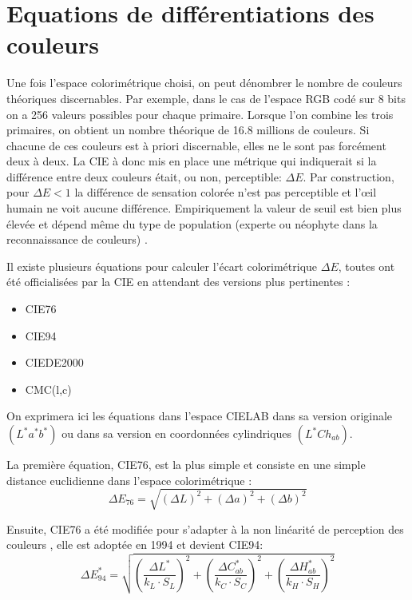 	\section{Equations de différentiations des couleurs}
	\par Une fois l'espace colorimétrique choisi, on peut dénombrer le nombre de couleurs théoriques discernables. Par exemple, dans le cas de l'espace RGB codé sur 8 bits on a 256 valeurs possibles pour chaque primaire. Lorsque l'on combine les trois primaires, on obtient un nombre théorique de 16.8 millions de couleurs. Si chacune de ces couleurs est à priori discernable, elles ne le sont pas forcément deux à deux. La CIE à donc mis en place une métrique qui indiquerait si la différence entre deux couleurs était, ou non, perceptible: $\Delta E$. Par construction, pour $\Delta E < 1$ la différence de sensation colorée n'est pas  perceptible et l'œil humain ne voit aucune différence. Empiriquement la valeur de seuil est bien plus élevée et dépend même du type de population (experte ou néophyte dans la reconnaissance de couleurs) \citep{sharma_digital_2013, vidal_color-difference_2016}.
	
	\par Il existe plusieurs équations pour calculer l'écart colorimétrique $\Delta E$, toutes ont été officialisées par la CIE en attendant des versions plus pertinentes \citep{beretta_understanding_2000, habekost_which_2013, sharma_ciede2000_2005, robertson_historical_1990}:
	\begin{itemize}
		\item CIE76
		\item CIE94
		\item CIEDE2000
		\item CMC(l,c)
	\end{itemize}
	
	\par On exprimera ici les équations dans l'espace CIELAB dans sa version originale $(L^\ast a^\ast b^\ast)$ ou dans sa version en coordonnées cylindriques $(L^\ast C h_{ab})$.
	
	\par La première équation, CIE76, est la plus simple et consiste en une simple distance euclidienne dans l'espace colorimétrique \citep{sharma_digital_2013}:
	\begin{equation}
		\Delta E_{76} = \sqrt{(\Delta L)^2 + (\Delta a)^2 + (\Delta b)^2}
		\label{eq:de_76}
	\end{equation}
	
	\par Ensuite, CIE76 a été modifiée pour s'adapter à la non linéarité de perception des couleurs \citep{beretta_understanding_2000}, elle est adoptée en 1994 et devient CIE94:
	\begin{equation}
		\Delta E^\ast_{94} = \sqrt{\left(\frac{\Delta L^\ast}{k_L \cdot S_L}\right)^2 + \left(\frac{\Delta C^\ast_{ab}}{k_C \cdot S_C}\right)^2 + \left(\frac{\Delta H^\ast_{ab}}{k_H \cdot S_H}\right)^2}
		\label{eq:de_94}
	\end{equation}
	
